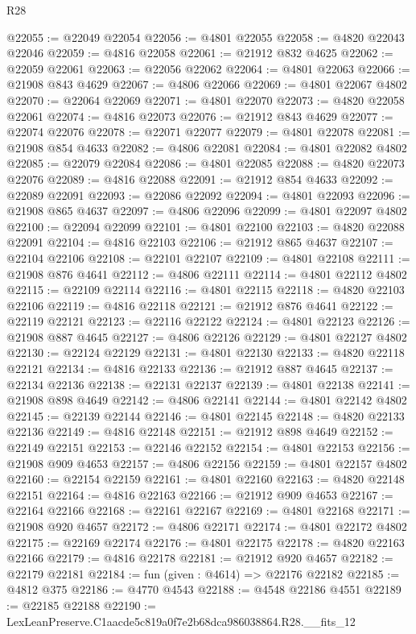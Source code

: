 \begin{lexlean}{R28}
\begin{coremodule}
@22055 := @22049 @22054
@22056 := @4801 @22055
@22058 := @4820 @22043 @22046
@22059 := @4816 @22058
@22061 := @21912 @832 @4625
@22062 := @22059 @22061
@22063 := @22056 @22062
@22064 := @4801 @22063
@22066 := @21908 @843 @4629
@22067 := @4806 @22066
@22069 := @4801 @22067 @4802
@22070 := @22064 @22069
@22071 := @4801 @22070
@22073 := @4820 @22058 @22061
@22074 := @4816 @22073
@22076 := @21912 @843 @4629
@22077 := @22074 @22076
@22078 := @22071 @22077
@22079 := @4801 @22078
@22081 := @21908 @854 @4633
@22082 := @4806 @22081
@22084 := @4801 @22082 @4802
@22085 := @22079 @22084
@22086 := @4801 @22085
@22088 := @4820 @22073 @22076
@22089 := @4816 @22088
@22091 := @21912 @854 @4633
@22092 := @22089 @22091
@22093 := @22086 @22092
@22094 := @4801 @22093
@22096 := @21908 @865 @4637
@22097 := @4806 @22096
@22099 := @4801 @22097 @4802
@22100 := @22094 @22099
@22101 := @4801 @22100
@22103 := @4820 @22088 @22091
@22104 := @4816 @22103
@22106 := @21912 @865 @4637
@22107 := @22104 @22106
@22108 := @22101 @22107
@22109 := @4801 @22108
@22111 := @21908 @876 @4641
@22112 := @4806 @22111
@22114 := @4801 @22112 @4802
@22115 := @22109 @22114
@22116 := @4801 @22115
@22118 := @4820 @22103 @22106
@22119 := @4816 @22118
@22121 := @21912 @876 @4641
@22122 := @22119 @22121
@22123 := @22116 @22122
@22124 := @4801 @22123
@22126 := @21908 @887 @4645
@22127 := @4806 @22126
@22129 := @4801 @22127 @4802
@22130 := @22124 @22129
@22131 := @4801 @22130
@22133 := @4820 @22118 @22121
@22134 := @4816 @22133
@22136 := @21912 @887 @4645
@22137 := @22134 @22136
@22138 := @22131 @22137
@22139 := @4801 @22138
@22141 := @21908 @898 @4649
@22142 := @4806 @22141
@22144 := @4801 @22142 @4802
@22145 := @22139 @22144
@22146 := @4801 @22145
@22148 := @4820 @22133 @22136
@22149 := @4816 @22148
@22151 := @21912 @898 @4649
@22152 := @22149 @22151
@22153 := @22146 @22152
@22154 := @4801 @22153
@22156 := @21908 @909 @4653
@22157 := @4806 @22156
@22159 := @4801 @22157 @4802
@22160 := @22154 @22159
@22161 := @4801 @22160
@22163 := @4820 @22148 @22151
@22164 := @4816 @22163
@22166 := @21912 @909 @4653
@22167 := @22164 @22166
@22168 := @22161 @22167
@22169 := @4801 @22168
@22171 := @21908 @920 @4657
@22172 := @4806 @22171
@22174 := @4801 @22172 @4802
@22175 := @22169 @22174
@22176 := @4801 @22175
@22178 := @4820 @22163 @22166
@22179 := @4816 @22178
@22181 := @21912 @920 @4657
@22182 := @22179 @22181
@22184 := fun (given : @4614) => @22176 @22182
@22185 := @4812 @375
@22186 := @4770 @4543
@22188 := @4548 @22186 @4551
@22189 := @22185 @22188
@22190 := LexLeanPreserve.C1aacde5c819a0f7e2b68dca986038864.R28.__fits_12

\end{coremodule}
\end{lexlean}
